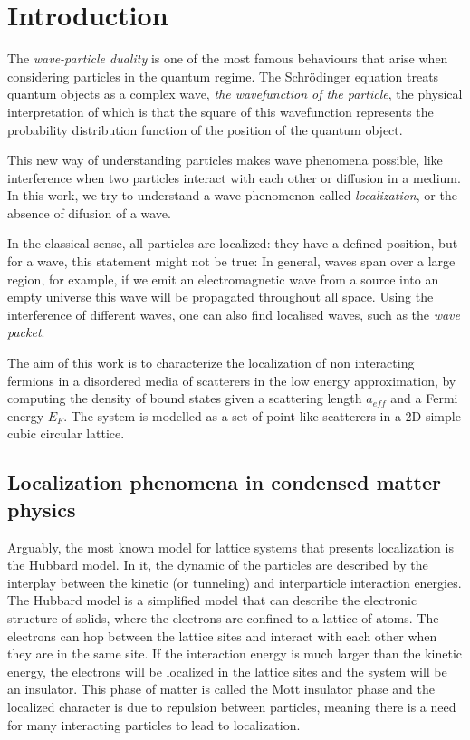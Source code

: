 \clearpage
\newpage
\section{Introduction}

The \textit{wave-particle duality} is one of the most famous behaviours that arise when considering particles in the quantum regime. The Schrödinger equation treats quantum objects as a complex wave, \textit{the wavefunction of the particle}, the physical interpretation of which is that the square of this wavefunction represents the probability distribution function of the position of the quantum object.

This new way of understanding particles makes wave phenomena possible, like interference when two particles interact with each other or diffusion in a medium. In this work, we try to understand a wave phenomenon called \textit{localization}, or the absence of difusion of a wave. 

In the classical sense, all particles are localized: they have a defined position, but for a wave, this statement might not be true: In general, waves span over a large region, for example, if we emit an electromagnetic wave from a source into an empty universe this wave will be propagated throughout all space. Using the interference of different waves, one can also find localised waves, such as the \textit{wave packet}.

The aim of this work is to characterize the localization of non interacting fermions in a disordered media of scatterers in the low energy approximation, by computing the density of bound states given a scattering length $a_{eff}$ and a Fermi energy $E_F$. The system is modelled as a set of point-like scatterers in a 2D simple cubic circular lattice. 

\subsection{Localization phenomena in condensed matter physics}

Arguably, the most known model for lattice systems that presents localization is the Hubbard model. In it, the dynamic of the particles are described by the interplay between the kinetic (or tunneling) and interparticle interaction energies. The Hubbard model is a simplified model that can describe the electronic structure of solids, where the electrons are confined to a lattice of atoms. The electrons can hop between the lattice sites and interact with each other when they are in the same site. If the interaction energy is much larger than the kinetic energy, the electrons will be localized in the lattice sites and the system will be an insulator. This phase of matter is called the Mott insulator phase and the localized character is due to repulsion between particles, meaning there is a need for many interacting particles to lead to localization.  

